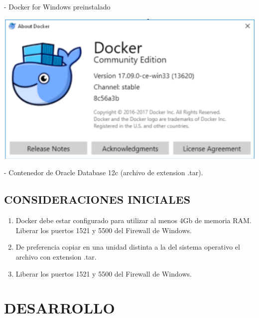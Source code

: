 \documentclass[12pt,letterpaper]{article}
\begin{document}
\begin{enumerate}[1.]
- Docker for Windows preinstalado

\begin{center}
\includegraphics[width=15cm]{./IMAGENES/img2}
\end{center} 
- Contenedor de Oracle Database 12c (archivo de extension .tar).
		\end{enumerate}





 \newpage
\subsection{CONSIDERACIONES INICIALES}

\begin{enumerate}[1.]
    \item Docker debe estar configurado para utilizar al menos 4Gb de memoria RAM.
Liberar los puertos 1521 y 5500 del Firewall de Windows.
    	
		\item De preferencia copiar en una unidad distinta a la del sistema operativo el archivo con extension .tar.
\item Liberar los puertos 1521 y 5500 del Firewall de Windows.
		\end{enumerate}


 
\section{DESARROLLO } 
\end{document}
